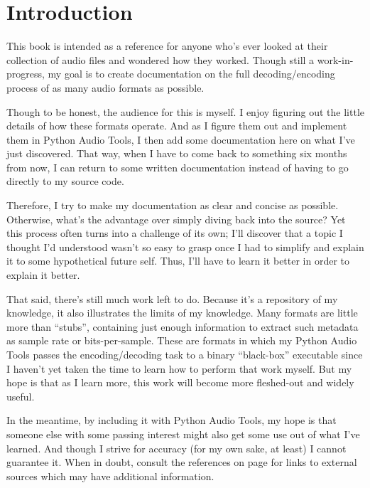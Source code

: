 \chapter{Introduction}
This book is intended as a reference for anyone who's ever looked
at their collection of audio files and wondered how they worked.
Though still a work-in-progress, my goal is to create documentation
on the full decoding/encoding process of as many audio formats as
possible.

Though to be honest, the audience for this is myself.
I enjoy figuring out the little details of how these formats operate.
And as I figure them out and implement them in Python Audio Tools,
I then add some documentation here on what I've just discovered.
That way, when I have to come back to something six months from now,
I can return to some written documentation instead of having to go
directly to my source code.

Therefore, I try to make my documentation as clear and concise
as possible.
Otherwise, what's the advantage over simply diving back into the source?
Yet this process often turns into a challenge of its own;
I'll discover that a topic I thought I'd understood wasn't so
easy to grasp once I had to simplify and explain it to some
hypothetical future self.
Thus, I'll have to learn it better in order to explain it better.

That said, there's still much work left to do.
Because it's a repository of my knowledge, it also illustrates
the limits of my knowledge.
Many formats are little more than ``stubs'', containing
just enough information to extract such metadata as
sample rate or bits-per-sample.
These are formats in which my Python Audio Tools passes the
encoding/decoding task to a binary ``black-box'' executable
since I haven't yet taken the time to learn how to perform that
work myself.
But my hope is that as I learn more, this work will become
more fleshed-out and widely useful.

In the meantime, by including it with Python Audio Tools,
my hope is that someone else with some passing interest might also
get some use out of what I've learned.
And though I strive for accuracy (for my own sake, at least)
I cannot guarantee it.
When in doubt, consult the references on page \pageref{references}
for links to external sources which may have additional information.

